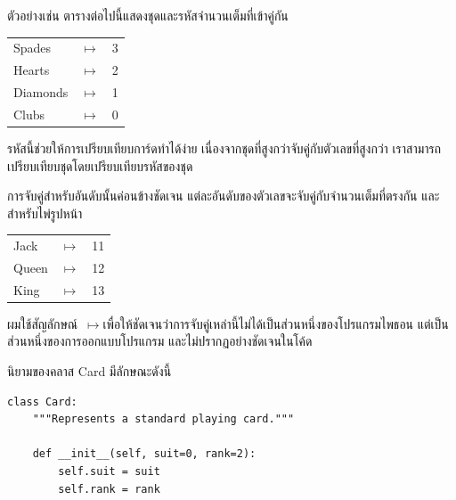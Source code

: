 \newcommand{\mymapsto}{$\mapsto$}

ตัวอย่างเช่น ตารางต่อไปนี้แสดงชุดและรหัสจำนวนเต็มที่เข้าคู่กัน

\begin{tabular}{l c l}
Spades & \mymapsto & 3 \\
Hearts & \mymapsto & 2 \\
Diamonds & \mymapsto & 1 \\
Clubs & \mymapsto & 0
\end{tabular}


รหัสนี้ช่วยให้การเปรียบเทียบการ์ดทำได้ง่าย เนื่องจากชุดที่สูงกว่าจับคู่กับตัวเลขที่สูงกว่า เราสามารถเปรียบเทียบชุดโดยเปรียบเทียบรหัสของชุด


การจับคู่สำหรับอันดับนั้นค่อนข้างชัดเจน แต่ละอันดับของตัวเลขจะจับคู่กับจำนวนเต็มที่ตรงกัน และสำหรับไพ่รูปหน้า

\begin{tabular}{l c l}
Jack & \mymapsto & 11 \\
Queen & \mymapsto & 12 \\
King & \mymapsto & 13 \\
\end{tabular}


ผมใช้สัญลักษณ์~\mymapsto เพื่อให้ชัดเจนว่าการจับคู่เหล่านี้ไม่ได้เป็นส่วนหนึ่งของโปรแกรมไพธอน แต่เป็นส่วนหนึ่งของการออกแบบโปรแกรม และไม่ปรากฏอย่างชัดเจนในโค้ด


นิยามของคลาส Card มีลักษณะดังนี้

\begin{verbatim}
class Card:
    """Represents a standard playing card."""

    def __init__(self, suit=0, rank=2):
        self.suit = suit
        self.rank = rank
\end{verbatim}
%


